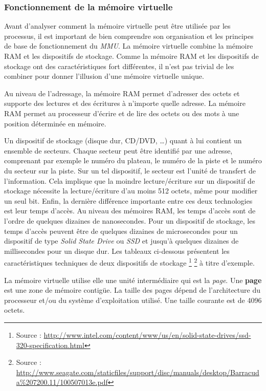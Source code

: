 \subsubsection{Fonctionnement de la mémoire virtuelle}

Avant d'analyser comment la mémoire virtuelle peut être utilisée par les
processus, il est important de bien comprendre son organisation et les
principes de base de fonctionnement du \textit{MMU}. La mémoire
virtuelle combine la mémoire RAM et les dispositifs de stockage. Comme
la mémoire RAM et les dispositifs de stockage ont des caractéristiques
fort différentes, il n'est pas trivial de les combiner pour donner
l'illusion d'une mémoire virtuelle unique.\newline

Au niveau de l'adressage, la mémoire RAM permet d'adresser des octets et
supporte des lectures et des écritures à n'importe quelle adresse. La
mémoire RAM permet au processeur d'écrire et de lire des octets ou des
mots à une position déterminée en mémoire.\newline

Un dispositif de stockage (disque dur, CD/DVD, \ldots) quant à lui
contient un ensemble de secteurs. Chaque secteur peut être identifié par
une adresse, comprenant par exemple le numéro du plateau, le numéro de
la piste et le numéro du secteur sur la piste. Sur un tel dispositif, le
secteur est l'unité de transfert de l'information. Cela implique que la
moindre lecture/écriture sur un dispositif de stockage nécessite la
lecture/écriture d'au moins 512 octets, même pour modifier un seul bit.
Enfin, la dernière différence importante entre ces deux technologies est
leur temps d'accès. Au niveau des mémoires RAM, les temps d'accès sont
de l'ordre de quelques dizaines de nanosecondes. Pour un dispositif de
stockage, les temps d'accès peuvent être de quelques dizaines de
microsecondes pour un dispositif de type \textit{Solid State Drive}
ou \textit{SSD} et jusqu'à quelques dizaines de millisecondes pour un
disque dur. Les tableaux ci-dessous présentent les caractéristiques
techniques de deux dispositifs de stockage \footnote{Source :
    \url{http://www.intel.com/content/www/us/en/solid-state-drives/ssd-320-specification.html}}
    \footnote{Source :
        \url{http://www.seagate.com/staticfiles/support/disc/manuals/desktop/Barracuda\%207200.11/100507013e.pdf}} à titre d'exemple.\newline

La mémoire virtuelle utilise elle une unité intermédiaire qui est la
\textit{page}. Une \textbf{page} est une zone de mémoire contigüe. La
taille des pages dépend de l'architecture du processeur et/ou du système
d'exploitation utilisé. Une taille courante est de 4096 octets. \newline

